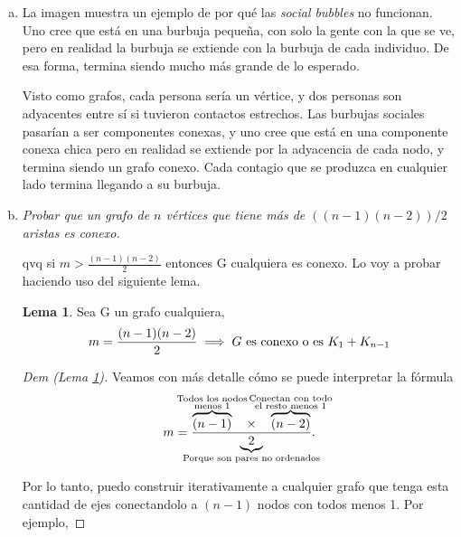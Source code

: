 \documentclass[12pt, a4paper]{report}
\theoremstyle{definition} %
\newtheorem{lemma}{Lema}
\begin{document}
\begin{enumerate}[a)]
    \item La imagen muestra un ejemplo de por qué las \textit{social bubbles} no funcionan. Uno cree que está en una burbuja pequeña, con solo la gente con la que se ve, pero en realidad la burbuja se extiende con la burbuja de cada individuo. De esa forma, termina siendo mucho más grande de lo esperado.
    
    Visto como grafos, cada persona sería un vértice, y dos personas son adyacentes entre sí si tuvieron contactos estrechos. Las burbujas sociales pasarían a ser componentes conexas, y uno cree que está en una componente conexa chica pero en realidad se extiende por la adyacencia de cada nodo, y termina siendo un grafo conexo. Cada contagio que se produzca en cualquier lado termina llegando a su burbuja.

    \item \textit{Probar que un grafo de $n$ vértices que tiene más de $((n-1)(n-2))/2$ aristas es conexo.}
    
    qvq si $m > \frac{(n-1)(n-2)}{2}$ entonces G cualquiera es conexo. Lo voy a probar haciendo uso del siguiente lema.

    \begin{lemma}\label{3/lemma}
        Sea G un grafo cualquiera,
        \[
            m = \frac{(n-1)(n-2)}{2} 
            \implies 
            G \text{ es conexo o es } K_1 + K_{n-1} \\
        \]
    \end{lemma}

    \begin{proof}[Dem (Lema \ref{3/lemma})]
        Veamos con más detalle cómo se puede interpretar la fórmula
        \[
            m = \frac
            {
                \overbrace{(n-1)}^{\mathclap{\substack{\text{Todos los nodos}\\\text{menos 1}}}}
                \quad
                \times
                \quad
                \overbrace{(n-2)}^{\mathclap{\substack{\text{Conectan con todo}\\\text{el resto menos 1}}}}
            }
            {
                \underbrace{2}_{\mathclap{\text{Porque son pares no ordenados}}}
            }.
        \]

        Por lo tanto, puedo construir iterativamente a cualquier grafo que tenga esta cantidad de ejes conectandolo a $(n - 1)$ nodos con todos menos 1. Por ejemplo,


\end{proof}
\end{enumerate}
\end{document}
